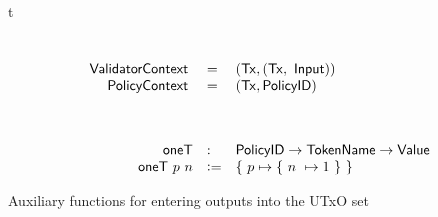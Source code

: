 \begin{ruledfigure}{t}
\begin{displaymath}
\begin{array}{rll}
    \nextdef
    \s{\vlctx}\s{ } &=& (\Tx, (\Tx,~\Input)) \\
    \s{\mpsctx}\s{ } &=& (\Tx, \Policy) \\
    \\
  \nextdef
  \fun{oneT} &:& \Policy \to \TokenName \to \Value \\
  \fun{oneT}~ p~n &\leteq& \{ ~p \mapsto \{~n~ \mapsto 1~\}~\} \\
  \end{array}
  \end{displaymath}
  \caption{Auxiliary functions for entering outputs into the UTxO set}
  \label{fig:ctx-types}
\end{ruledfigure}

